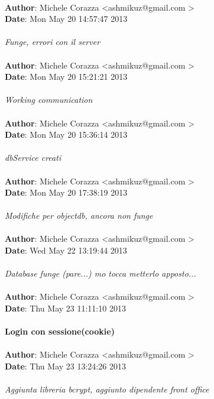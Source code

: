 \documentclass[a4paper,12pt]{article} %
\begin{document}
\\
\textbf{Author}: Michele Corazza \textless ashmikuz@gmail.com \textgreater \\
\textbf{Date}:   Mon May 20 14:57:47 2013 \\
\\
    \emph{Funge, errori con il server}\\
\\
\textbf{Author}: Michele Corazza \textless ashmikuz@gmail.com \textgreater \\
\textbf{Date}:   Mon May 20 15:21:21 2013 \\
\\
    \emph{Working communication}\\
\\
\textbf{Author}: Michele Corazza \textless ashmikuz@gmail.com \textgreater \\
\textbf{Date}:   Mon May 20 15:36:14 2013 \\
\\
    \emph{dbService creati}\\
\\
\textbf{Author}: Michele Corazza \textless ashmikuz@gmail.com \textgreater \\
\textbf{Date}:   Mon May 20 17:38:19 2013 \\
\\
    \emph{Modifiche per objectdb, ancora non funge}\\
\\
\textbf{Author}: Michele Corazza \textless ashmikuz@gmail.com \textgreater \\
\textbf{Date}:   Wed May 22 13:19:44 2013 \\
\\
    \emph{Database funge (pare...) mo tocca metterlo apposto...}\\
\\
\textbf{Author}: Michele Corazza \textless ashmikuz@gmail.com \textgreater \\
\textbf{Date}:   Thu May 23 11:11:10 2013 \\
\\
    \textbf{Login con sessione(cookie)}\\
\\
\textbf{Author}: Michele Corazza \textless ashmikuz@gmail.com \textgreater \\
\textbf{Date}:   Thu May 23 13:24:26 2013 \\
\\
    \emph{Aggiunta libreria bcrypt, aggiunto dipendente front office}\\
\end{document}
